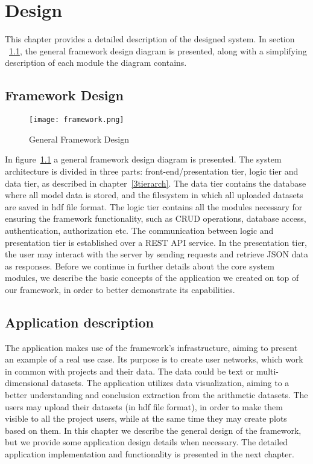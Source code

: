 
\chapter{Design} %
\label{chapter4_d}
This chapter provides a detailed description of the designed system. In section ~\ref{gfd}, the general framework design diagram is presented, along with a simplifying description of each module the diagram contains. 


\section{Framework Design}
\label{gfd}
\begin{figure}
	\centerline{\texttt{[image: framework.png]}}
	\caption{General Framework Design}
	\label{framework}
\end{figure}
In figure~\ref{framework} a general framework design diagram is presented. The system architecture is divided in three parts: front-end/presentation tier, logic tier and data tier, as described in chapter~\ref{3tierarch}. The data tier contains the database where all model data is stored, and the filesystem in which all uploaded datasets are saved in hdf file format. The logic tier contains all the modules necessary for ensuring the framework functionality, such as CRUD operations, database access, authentication, authorization etc. The communication between logic and presentation tier is established over a REST API service. In the presentation tier, the user may interact with the server by sending requests and retrieve JSON data as responses. Before we continue in further details about the core system modules,  we describe the basic concepts of the application we created on top of our framework, in order to better demonstrate its capabilities.

\section{Application description}
The application makes use of the framework's infrastructure, aiming to present an example of a real use case. Its purpose is to create user networks, which work in common with projects and their data. The data could be text or multi-dimensional datasets. The application utilizes data visualization, aiming to a better understanding and conclusion extraction from the arithmetic datasets. The users may upload their datasets (in hdf file format), in order to make them visible to all the project users, while at the same time they may create plots based on them. In this chapter we describe the general design of the framework, but we provide some application design details when necessary. The detailed application implementation and functionality is presented in the next chapter.

